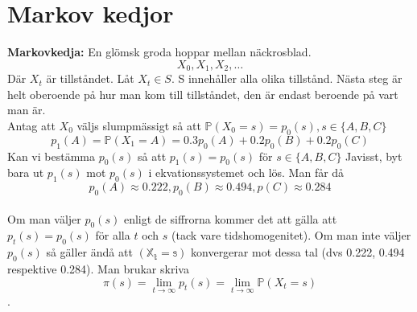 \chapter{Markov kedjor}
\textbf{Markovkedja:} En glömsk groda hoppar mellan näckrosblad.
$$X_0,X_1,X_2,\ldots$$
Där $X_t$ är tillståndet.
Låt $X_t\in S$. S innehåller alla olika tillstånd.
Nästa steg är helt oberoende på hur man kom till tillståndet, den är endast beroende på vart man är.\\
Antag att $X_0$ väljs slumpmässigt så att $\mathbb{P}(X_0=s)=p_0(s), s\in \{A,B,C\}$\\
$$p_1(A)=\mathbb{P}(X_1=A)=0.3p_0(A)+0.2p_0(B)+0.2p_0(C)$$
Kan vi bestämma $p_0(s)$ så att $p_1(s)=p_0(s)$ för $s\in \{A,B,C\}$
Javisst, byt bara ut $p_1(s)$ mot $p_0(s)$ i ekvationssystemet och lös. Man får då
$$p_0(A)\approx0.222, p_0(B)\approx0.494, p(C)\approx 0.284$$\\

Om man väljer $p_0(s)$ enligt de siffrorna kommer det att gälla att $p_t(s)=p_0(s)$ för alla $t$ och $s$ (tack vare tidshomogenitet). Om man inte väljer $p_0(s)$ så gäller ändå att $\mathbb{(X_t=s)}$ konvergerar mot dessa tal (dvs 0.222, 0.494 respektive 0.284). Man brukar skriva
$$\pi(s)=\lim\limits_{t\to \infty}p_t(s)=\lim\limits_{t\to \infty}\mathbb{P}(X_t=s)$$.

